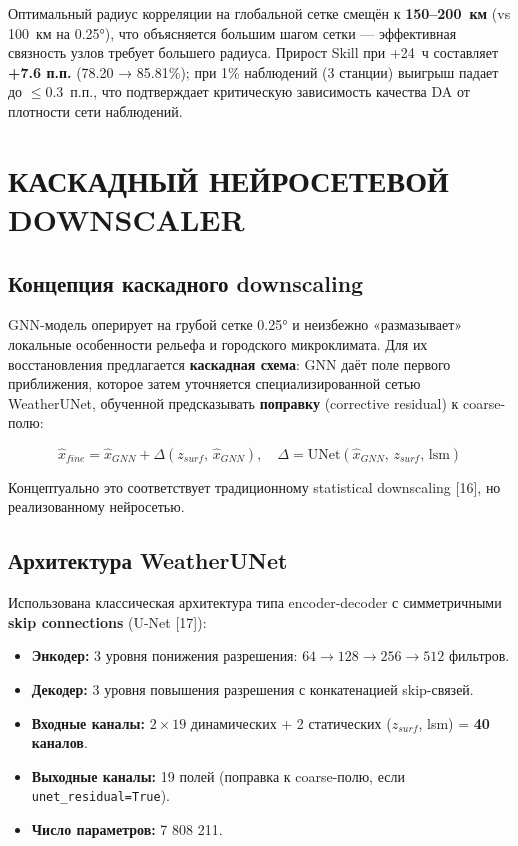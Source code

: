 \documentclass[14pt,a4paper]{extarticle}
\numberwithin{table}{section}
\numberwithin{figure}{section}
\numberwithin{equation}{section}
\providecommand{\tightlist}{%
  \setlength{\itemsep}{0pt}\setlength{\parskip}{0pt}}
\begin{document}
Оптимальный радиус корреляции на глобальной сетке смещён к
\textbf{150--200~км} (vs 100~км на 0.25°), что объясняется большим
шагом сетки --- эффективная связность узлов требует большего
радиуса. Прирост Skill при +24~ч составляет \textbf{+7.6 п.п.}
(78.20 → 85.81\%); при 1\% наблюдений (3 станции) выигрыш падает
до \(\le 0.3\)~п.п., что подтверждает критическую зависимость
качества DA от плотности сети наблюдений.


\newpage

\section{КАСКАДНЫЙ НЕЙРОСЕТЕВОЙ DOWNSCALER}\label{ux43aux430ux441ux43aux430ux434ux43dux44bux439-ux43dux435ux439ux440ux43eux441ux435ux442ux435ux432ux43eux439-downscaler}

\subsection{Концепция каскадного downscaling}\label{ux43aux43eux43dux446ux435ux43fux446ux438ux44f-ux43aux430ux441ux43aux430ux434ux43dux43eux433ux43e-downscaling}

GNN-модель оперирует на грубой сетке 0.25° и неизбежно «размазывает»
локальные особенности рельефа и городского микроклимата. Для их
восстановления предлагается \textbf{каскадная схема}: GNN даёт поле
первого приближения, которое затем уточняется специализированной сетью
WeatherUNet, обученной предсказывать \textbf{поправку} (corrective
residual) к coarse-полю:

\[\hat{x}_{fine} = \hat{x}_{GNN} + \Delta(z_{surf},\, \hat{x}_{GNN}), \quad \Delta = \text{UNet}(\hat{x}_{GNN},\, z_{surf},\, \text{lsm})\]

Концептуально это соответствует традиционному statistical downscaling
{[}16{]}, но реализованному нейросетью.

\subsection{Архитектура WeatherUNet}\label{ux430ux440ux445ux438ux442ux435ux43aux442ux443ux440ux430-weatherunet}

Использована классическая архитектура типа encoder-decoder с
симметричными \textbf{skip connections} (U-Net {[}17{]}):

\begin{itemize}
\tightlist
\item
  \textbf{Энкодер:} 3 уровня понижения разрешения:
  \(64 \to 128 \to 256 \to 512\) фильтров.
\item
  \textbf{Декодер:} 3 уровня повышения разрешения с конкатенацией
  skip-связей.
\item
  \textbf{Входные каналы:} \(2 \times 19\) динамических + 2 статических
  (\(z_{surf}\), lsm) = \textbf{40 каналов}.
\item
  \textbf{Выходные каналы:} 19 полей (поправка к coarse-полю, если
  \texttt{unet\_residual=True}).
\item
  \textbf{Число параметров:} 7 808 211.
\end{itemize}
\end{document}
